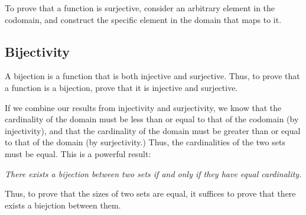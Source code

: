 \documentclass[12pt,letterpaper]{article}
\begin{document}
    To prove that a function is surjective, consider an arbitrary element in the codomain, and construct the specific element in the domain that maps to it.
    \begin{mdframed}\vspace{2 cm}\end{mdframed}
    
    \subsection{Bijectivity}
    
    A bijection is a function that is both injective and surjective. Thus, to prove that a function is a bijection, prove that it is injective and surjective.
    
    If we combine our results from injectivity and surjectivity, we know that the cardinality of the domain must be less than or equal to that of the codomain (by injectivity), and that the cardinality of the domain must be greater than or equal to that of the domain (by surjectivity.) Thus, the cardinalities of the two sets must be equal. This is a powerful result:
    
    \begin{center}
    \textit{There exists a bijection between two sets if and only if they have equal cardinality.}
    \end{center}
    
    Thus, to prove that the sizes of two sets are equal, it suffices to prove that there exists a biejction between them.

        
    \begin{figure}[h]
     \centering
    \end{figure}
    
\end{document}
